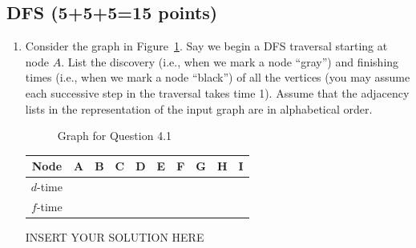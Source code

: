 \subsection{DFS (5+5+5=15 points)}

\begin{enumerate}
\item 
Consider the graph in Figure~\ref{fig:box2}. Say we begin a DFS traversal starting at node $A$. List the discovery (i.e., when we mark a node ``gray'') and finishing times (i.e., when we mark a node ``black'') of all the vertices (you may assume each successive step in the traversal takes time 1). Assume that the adjacency lists in the representation of the input graph are in alphabetical order.
\begin{figure}[h!]
\centering
    \caption{Graph for Question 4.1}
          \label{fig:box2}
\centering
\end{figure}

    \begin{center}
    \begin{tabular}{|c|c|c|c|c|c|c|c|c|c|}
    \hline
         Node & A & B & C & D & E & F & G & H & I\\
         \hline 
         $d$-time &  &  &  &  &  &  &  &  & \\
         \hline
         $f$-time &  &  &  &  &  &  &  &  &  \\
         \hline
    \end{tabular}
    \end{center}


\begin{solution}   INSERT YOUR SOLUTION HERE   \end{solution}
\end{enumerate}    

